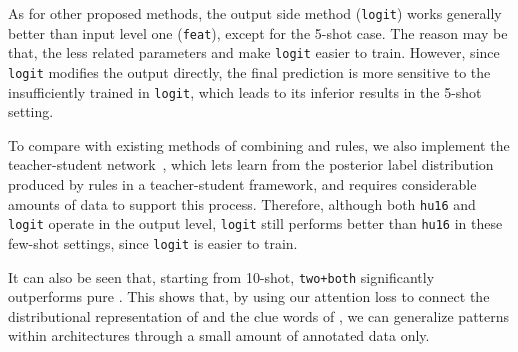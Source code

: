 As for other proposed methods, the output side method (\texttt{logit}) works generally better than input level one (\texttt{feat}), except for the 5-shot case.
The reason may be that, the less \RE related parameters and  make \texttt{logit} easier to train. %
However, since \texttt{logit} modifies the output directly, the final prediction is more sensitive to the insufficiently trained  in \texttt{logit}, which leads to its inferior results in the 5-shot setting.

To compare with existing methods of combining \NN and rules, we also implement the teacher-student
network~\cite{hu2016harnessing}, %
which lets \NN learn from the posterior label distribution produced by \FOL rules in a teacher-student framework,
and requires considerable amounts of data to support this process.
Therefore, although both \texttt{hu16} and \texttt{logit} operate in the output level, \texttt{logit}
still performs better than \texttt{hu16} in these few-shot settings, since \texttt{logit} is easier to train.


It can also be seen that, starting from 10-shot, \texttt{two+both} significantly outperforms pure \RE.
This shows that, by using our attention loss to connect the distributional representation of \NN and the clue words of \RE, we can generalize \RE patterns within \NN architectures through a small amount of annotated data only.


